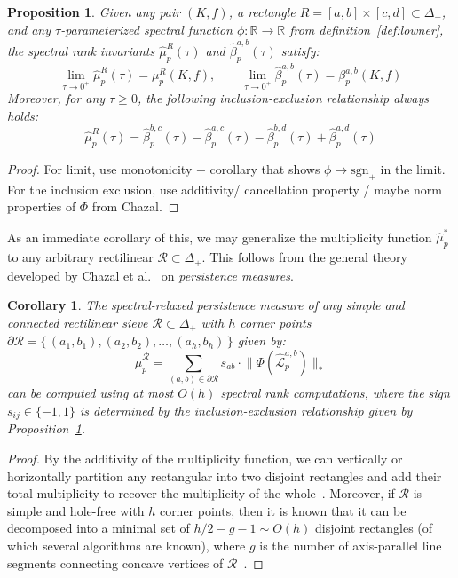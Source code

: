 \documentclass[10pt]{article}
\numberwithin{equation}{section}
\newcommand{\+}{%
	\raisebox{0.18ex}{\scaleobj{0.55}{+}}
}
\newtheorem{proposition}{Proposition}
\newtheorem{corollary}{Corollary}
\theoremstyle{definition}
\theoremstyle{definition}
\begin{document}
\begin{proposition}\label{prop:include_exclude}
Given any pair $(K, f)$, a rectangle $R = [a,b] \times [c,d] \subset \Delta_+$, and any $\tau$-parameterized spectral function $\phi: \mathbb{R} \to \mathbb{R}$ from definition~\ref{def:lowner}, the spectral rank invariants $\hat{\mu}_{p}^R(\tau)$ and $\hat{\beta}_{p}^{a,b}(\tau)$ satisfy: 
$$ \lim_{\tau \to 0^+ }\hat{\mu}_{p}^R(\tau) = \mu_p^R(K,f), \quad \quad \lim_{\tau \to 0^+ } \hat{\beta}_{p}^{a,b}(\tau) = \beta_{p}^{a,b}(K,f)$$
Moreover, for any $\tau \geq 0$, the following inclusion-exclusion relationship always holds:
$$\hat{\mu}_{p}^R(\tau)= \hat{\beta}_{p}^{b,c}(\tau) - \hat{\beta}_{p}^{a,c}(\tau) - \hat{\beta}_{p}^{b,d}(\tau) + \hat{\beta}_{p}^{a,d}(\tau)$$
\end{proposition}
\begin{proof}
	For limit, use monotonicity + corollary that shows $\phi \to \mathrm{sgn}_+$ in the limit. 
	For the inclusion exclusion, use additivity/ cancellation property / maybe norm properties of $\Phi$ from Chazal. 
\end{proof}
\noindent As an immediate corollary of this, we may generalize the multiplicity function $\hat{\mu}_p^\ast$ to any arbitrary rectilinear $\mathcal{R} \subset \Delta_+$. This follows from the general theory developed by Chazal et al.~\cite{chazal2016structure} on \emph{persistence measures}.
\begin{corollary}
	The spectral-relaxed \emph{persistence measure} of any simple and connected rectilinear sieve $\mathcal{R} \subset \Delta_+$ with $h$ corner points $\partial \mathcal{R} = \{ \, (a_1, b_1), (a_2, b_2), \dots,  (a_h, b_h) \, \}$ given by: 
	$$ \hat{\mu}^\mathcal{R}_p = \sum\limits_{(a,b) \in \partial \mathcal{R}} s_{ab} \cdot \lVert \Phi(\hat{\mathcal{L}}^{a,b}_p) \rVert_\ast$$
	can be computed using at most $O(h)$ spectral rank computations, where the sign $s_{ij} \in \{-1, 1\}$ is determined by the inclusion-exclusion relationship given by Proposition~\ref{prop:include_exclude}. 
\end{corollary}
\begin{proof}
	By the additivity of the multiplicity function, we can vertically or horizontally partition any rectangular into two disjoint rectangles and add their total multiplicity to recover the multiplicity of the whole~\cite{}. Moreover, if $\mathcal{R}$ is simple and hole-free with $h$ corner points, then it is known that it can be decomposed into a minimal set of $h/2-g-1 \sim O(h)$ disjoint rectangles (of which several algorithms are known), where $g$ is the number of axis-parallel line segments connecting concave vertices of $\mathcal{R}$~\cite{}.
\end{proof}
\end{document}
